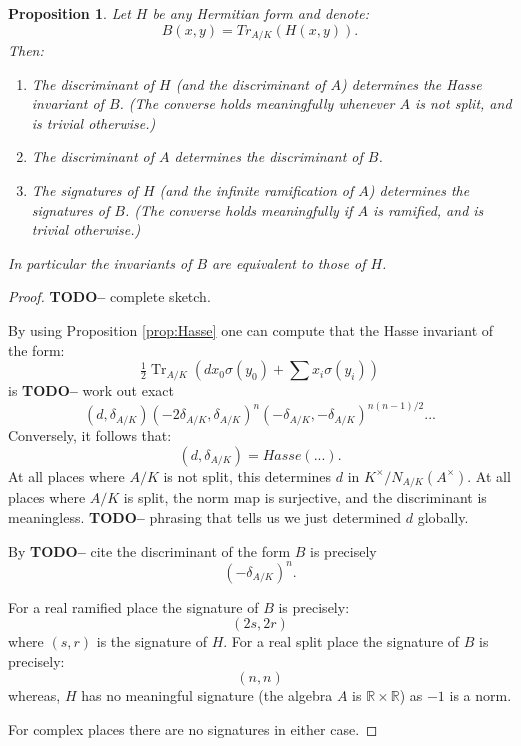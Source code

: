 \documentclass{article}
\theoremstyle{plain}
\newtheorem{proposition}[theorem]{Proposition}
\theoremstyle{definition}
\DeclareMathOperator{\Tr}{Tr}
\newcommand{\RR}{\mathbb{R}}
\newcommand{\TODO}[1]{\textbf{TODO-#1}}
\begin{document}
\begin{proposition}\label{prop:InvariantRelations}
Let $H$ be any Hermitian form and denote:
\[ B(x,y) = Tr_{A/K}(H(x,y)). \]
Then:
\begin{enumerate}
\item The discriminant of $H$ (and the discriminant of $A$) determines the Hasse invariant of $B$. (The converse holds meaningfully whenever $A$ is not split, and is trivial otherwise.)
\item The discriminant of $A$ determines the discriminant of $B$.
\item The signatures of $H$ (and the infinite ramification of $A$) determines the signatures of $B$. (The converse holds meaningfully if $A$ is ramified, and is trivial otherwise.)
\end{enumerate}
In particular the invariants of $B$ are equivalent to those of $H$.
\end{proposition}
\begin{proof}
\TODO - complete sketch.

By using Proposition \ref{prop:Hasse} one can compute that the Hasse invariant of the form:
\[ \tfrac{1}{2}\Tr_{A/K}(dx_0\sigma(y_0) + \sum x_i\sigma(y_i)) \]
is \TODO - work out exact 
\[ (d,\delta_{A/K})(-2\delta_{A/K},\delta_{A/K})^n(-\delta_{A/K},-\delta_{A/K})^{n(n-1)/2}... \]
Conversely, it follows that:
\[ (d,\delta_{A/K}) = Hasse (...). \]
At all places where $A/K$ is not split, this determines $d$ in $K^\times/N_{A/K}(A^\times)$.
At all places where $A/K$ is split, the norm map is surjective, and the discriminant is meaningless.
\TODO - phrasing that tells us we just determined $d$ globally.


By \TODO - cite the discriminant of the form $B$ is precisely
\[ (-\delta_{A/K})^n. \]

For a real ramified place the signature of $B$ is precisely:
\[ (2s,2r) \]
where $(s,r)$ is the signature of $H$.
For a real split place the signature of $B$ is precisely:
\[ (n,n) \]
whereas, $H$ has no meaningful signature (the algebra $A$ is $\RR\times \RR$) as $-1$ is a norm.

For complex places there are no signatures in either case.
\end{proof}
\end{document}
